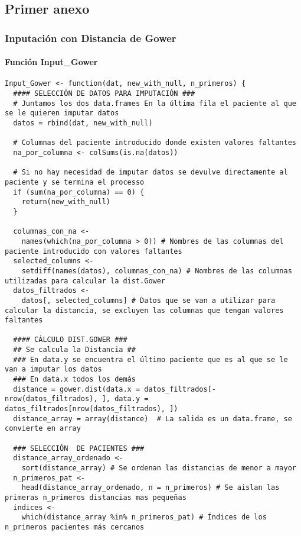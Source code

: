 \subsection{Primer anexo} \label{sec:anexo1}

\subsubsection{Inputación con Distancia de Gower}\label{sec:codigo-input-gower}

\paragraph*{Función Input\_Gower}\label{sec:codigo-input-gower-fun}


\begin{lstlisting}[style=mystyle,caption={Input\_Gower.R}, label={lst:input-gower-fun}]
  Input_Gower <- function(dat, new_with_null, n_primeros) {
  #### SELECCIÓN DE DATOS PARA IMPUTACIÓN ###
  # Juntamos los dos data.frames En la última fila el paciente al que se le quieren imputar datos
  datos = rbind(dat, new_with_null)
  
  # Columnas del paciente introducido donde existen valores faltantes
  na_por_columna <- colSums(is.na(datos))
  
  # Si no hay necesidad de imputar datos se devulve directamente al paciente y se termina el processo
  if (sum(na_por_columna) == 0) {
    return(new_with_null)
  }
  
  columnas_con_na <-
    names(which(na_por_columna > 0)) # Nombres de las columnas del paciente introducido con valores faltantes
  selected_columns <-
    setdiff(names(datos), columnas_con_na) # Nombres de las columnas utilizadas para calcular la dist.Gower
  datos_filtrados <-
    datos[, selected_columns] # Datos que se van a utilizar para calcular la distancia, se excluyen las columnas que tengan valores faltantes
  
  #### CÁLCULO DIST.GOWER ###
  ## Se calcula la Distancia ##
  ### En data.y se encuentra el último paciente que es al que se le van a imputar los datos
  ### En data.x todos los demás
  distance = gower.dist(data.x = datos_filtrados[-nrow(datos_filtrados), ], data.y =  datos_filtrados[nrow(datos_filtrados), ])
  distance_array = array(distance)  # La salida es un data.frame, se convierte en array
  
  ### SELECCIÓN  DE PACIENTES ###
  distance_array_ordenado <-
    sort(distance_array) # Se ordenan las distancias de menor a mayor
  n_primeros_pat <-
    head(distance_array_ordenado, n = n_primeros) # Se aislan las primeras n_primeros distancias mas pequeñas
  indices <-
    which(distance_array %in% n_primeros_pat) # Índices de los n_primeros pacientes más cercanos
  

\end{lstlisting}
